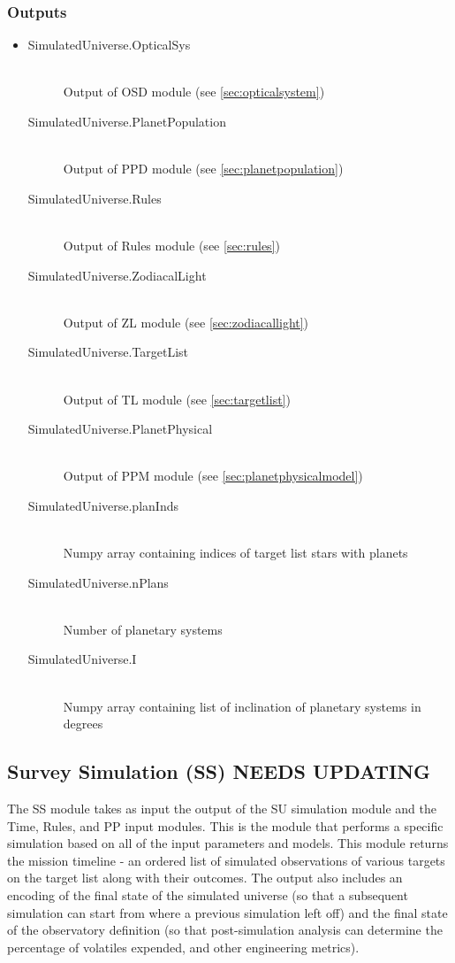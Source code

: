 \documentclass[cleanfoot]{asme2ej}
\begin{document}
\subsubsection*{Outputs}
\begin{itemize}
    \item
    \begin{description}
        \item[SimulatedUniverse.OpticalSys] \hfill \\
        Output of OSD module (see \ref{sec:opticalsystem})
        \item[SimulatedUniverse.PlanetPopulation] \hfill \\
        Output of PPD module (see \ref{sec:planetpopulation})
        \item[SimulatedUniverse.Rules] \hfill \\
        Output of Rules module (see \ref{sec:rules})
        \item[SimulatedUniverse.ZodiacalLight] \hfill \\
        Output of ZL module (see \ref{sec:zodiacallight})
        \item[SimulatedUniverse.TargetList] \hfill \\
        Output of TL module (see \ref{sec:targetlist})
        \item[SimulatedUniverse.PlanetPhysical] \hfill \\
        Output of PPM module (see \ref{sec:planetphysicalmodel})
        \item[SimulatedUniverse.planInds] \hfill \\
        Numpy array containing indices of target list stars with planets
        \item[SimulatedUniverse.nPlans] \hfill \\
        Number of planetary systems
        \item[SimulatedUniverse.I] \hfill \\
        Numpy array containing list of inclination of planetary systems in degrees
    \end{description}
\end{itemize}


\subsection{Survey Simulation (SS) NEEDS UPDATING}
The SS module takes as input the output of the SU simulation module and the Time, Rules, and PP input modules. This is the module that performs a specific simulation based on all of the input parameters and models. This module returns the mission timeline - an ordered list of simulated observations of various targets on the target list along with their outcomes.  The output also includes an encoding of the final state of the simulated universe (so that a subsequent simulation can start from where a previous simulation left off) and the final state of the observatory definition (so that post-simulation analysis can determine the percentage of volatiles expended, and other engineering metrics).
\end{document}
